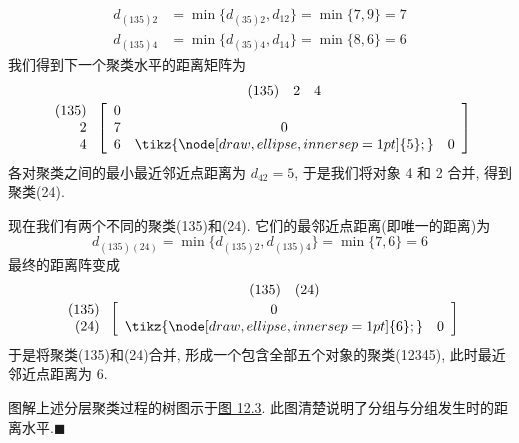 
\[
\begin{aligned}
d_{(135)2}&=\min\{d_{(35)2},d_{12}\}=\min\{7,9\}=7\\
d_{(135)4}&=\min\{d_{(35)4},d_{14}\}=\min\{8,6\}=6
\end{aligned}
\]
我们得到下一个聚类水平的距离矩阵为
\[
\begin{array}{r@{\;}c}
 & \begin{array}{ccc}(135)&2&4\end{array}\\[2pt]
\begin{array}{r}(135)\\2\\4\end{array} &
\left[\begin{array}{ccc}
0&&\\
7&0&\\
6&\tikz{\node[draw,ellipse,inner sep=1pt]{5};}&0
\end{array}\right]
\end{array}
\]
各对聚类之间的最小最近邻近点距离为 $d_{42}=5$, 于是我们将对象 4 和 2 合并, 得到聚类(24).

现在我们有两个不同的聚类(135)和(24). 它们的最邻近点距离(即唯一的距离)为
\[
d_{(135)(24)}=\min\{d_{(135)2},d_{(135)4}\}=\min\{7,6\}=6
\]
最终的距离阵变成
\[
\begin{array}{r@{\;}c}
 & \begin{array}{cc}(135)&(24)\end{array}\\[2pt]
\begin{array}{r}(135)\\(24)\end{array} &
\left[\begin{array}{cc}
0&\\
\tikz{\node[draw,ellipse,inner sep=1pt]{6};}&0
\end{array}\right]
\end{array}
\]
于是将聚类(135)和(24)合并, 形成一个包含全部五个对象的聚类(12345), 此时最近邻近点距离为 6.

图解上述分层聚类过程的树图示于\hyperref[fig:12.3]{图 12.3}. 此图清楚说明了分组与分组发生时的距离水平.\hfill$\blacksquare$

